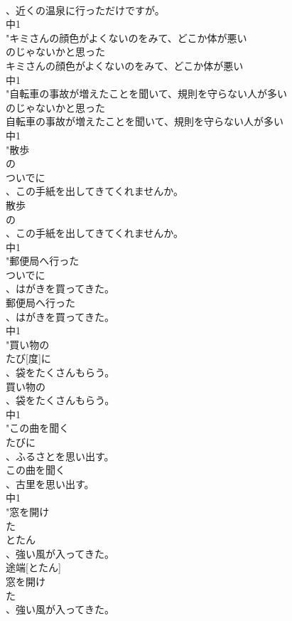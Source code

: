 \documentclass[8pt]{extreport}
\begin{document}
\begin{CJK}{UTF8}{min}
\\	、近くの温泉に行っただけですが。
\\	中1
\\	"キミさんの顔色がよくないのをみて、どこか体が悪い
\\	のじゃないかと思った
\\	キミさんの顔色がよくないのをみて、どこか体が悪い
\\	中1
\\	"自転車の事故が増えたことを聞いて、規則を守らない人が多い
\\	のじゃないかと思った
\\	自転車の事故が増えたことを聞いて、規則を守らない人が多い
\\	中1
\\	"散歩
\\	の
\\	ついでに
\\	、この手紙を出してきてくれませんか。
\\	散歩
\\	の
\\	、この手紙を出してきてくれませんか。
\\	中1
\\	"郵便局へ行った
\\	ついでに
\\	、はがきを買ってきた。
\\	郵便局へ行った
\\	、はがきを買ってきた。
\\	中1
\\	"買い物の
\\	たび[度]に
\\	、袋をたくさんもらう。
\\	買い物の
\\	、袋をたくさんもらう。
\\	中1
\\	"この曲を聞く
\\	たびに
\\	、ふるさとを思い出す。
\\	この曲を聞く
\\	、古里を思い出す。
\\	中1
\\	"窓を開け
\\	た
\\	とたん
\\	、強い風が入ってきた。　
\\	途端[とたん]
\\	窓を開け
\\	た
\\	、強い風が入ってきた。

\end{CJK}
\end{document}
